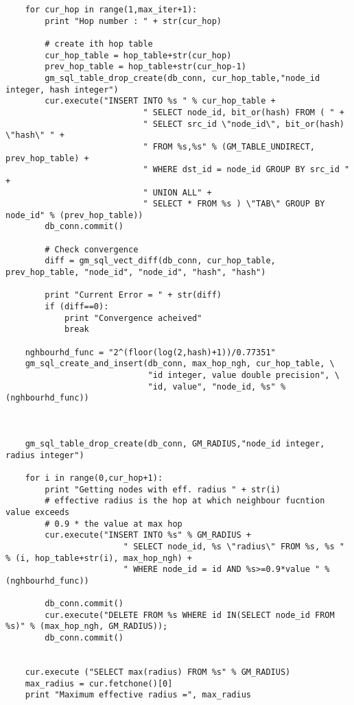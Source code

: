 \documentclass[11pt]{article}
\begin{document}
\begin{lstlisting}
    for cur_hop in range(1,max_iter+1):
        print "Hop number : " + str(cur_hop)
        
        # create ith hop table
        cur_hop_table = hop_table+str(cur_hop)
        prev_hop_table = hop_table+str(cur_hop-1)
        gm_sql_table_drop_create(db_conn, cur_hop_table,"node_id integer, hash integer")
        cur.execute("INSERT INTO %s " % cur_hop_table +
                            " SELECT node_id, bit_or(hash) FROM ( " +
                            " SELECT src_id \"node_id\", bit_or(hash) \"hash\" " +
                            " FROM %s,%s" % (GM_TABLE_UNDIRECT, prev_hop_table) +
                            " WHERE dst_id = node_id GROUP BY src_id " +
                            " UNION ALL" +
                            " SELECT * FROM %s ) \"TAB\" GROUP BY node_id" % (prev_hop_table))
        db_conn.commit()
        
        # Check convergence
        diff = gm_sql_vect_diff(db_conn, cur_hop_table, prev_hop_table, "node_id", "node_id", "hash", "hash")
        
        print "Current Error = " + str(diff)
        if (diff==0):
            print "Convergence acheived"    
            break
                                       
    nghbourhd_func = "2^(floor(log(2,hash)+1))/0.77351"
    gm_sql_create_and_insert(db_conn, max_hop_ngh, cur_hop_table, \
                             "id integer, value double precision", \
                             "id, value", "node_id, %s" % (nghbourhd_func))
    
                             
                             
    gm_sql_table_drop_create(db_conn, GM_RADIUS,"node_id integer, radius integer")  
    
    for i in range(0,cur_hop+1):
        print "Getting nodes with eff. radius " + str(i)
        # effective radius is the hop at which neighbour fucntion value exceeds 
        # 0.9 * the value at max hop
        cur.execute("INSERT INTO %s" % GM_RADIUS +
                        " SELECT node_id, %s \"radius\" FROM %s, %s " % (i, hop_table+str(i), max_hop_ngh) +
                        " WHERE node_id = id AND %s>=0.9*value " % (nghbourhd_func))
                        
        db_conn.commit()
        cur.execute("DELETE FROM %s WHERE id IN(SELECT node_id FROM %s)" % (max_hop_ngh, GM_RADIUS));
        db_conn.commit()

     
    cur.execute ("SELECT max(radius) FROM %s" % GM_RADIUS)
    max_radius = cur.fetchone()[0]   
    print "Maximum effective radius =", max_radius
    

\end{lstlisting}
\end{document}
